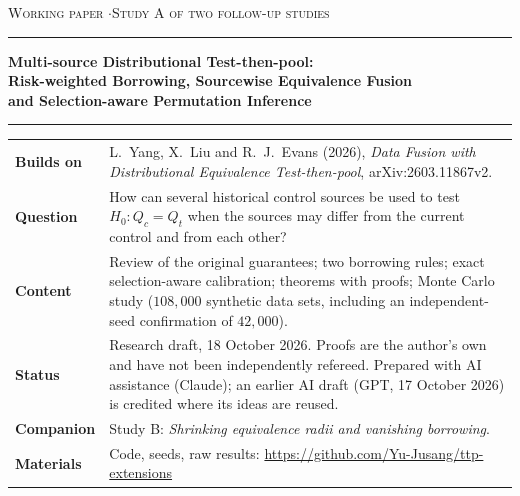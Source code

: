 \documentclass[11pt,a4paper]{article}
\begin{document}
\begin{titlepage}
\vspace*{20mm}
{\small\textsc{Working paper \quad$\cdot$\quad Study A of two follow-up studies}}\par
\vspace{6mm}
\rule{\textwidth}{0.6pt}\par\vspace{5mm}
{\LARGE\bfseries Multi-source Distributional Test-then-pool:\\[2mm] Risk-weighted Borrowing, Sourcewise Equivalence Fusion\\[2mm] and Selection-aware Permutation Inference\par}
\vspace{5mm}\rule{\textwidth}{0.6pt}\par
\vspace{10mm}
\begin{tabularx}{\textwidth}{@{}lX@{}}
\textbf{Builds on} & L.~Yang, X.~Liu and R.~J.~Evans (2026), \emph{Data Fusion with Distributional Equivalence Test-then-pool}, arXiv:2603.11867v2. \\[1mm]
\textbf{Question} & How can several historical control sources be used to test $H_0:Q_c=Q_t$ when the sources may differ from the current control and from each other? \\[1mm]
\textbf{Content} & Review of the original guarantees; two borrowing rules; exact selection-aware calibration; theorems with proofs; Monte Carlo study ($108{,}000$ synthetic data sets, including an independent-seed confirmation of $42{,}000$). \\[1mm]
\textbf{Status} & Research draft, 18 October 2026. Proofs are the author's own and have not been independently refereed. Prepared with AI assistance (Claude); an earlier AI draft (GPT, 17 October 2026) is credited where its ideas are reused. \\[1mm]
\textbf{Companion} & Study B: \emph{Shrinking equivalence radii and vanishing borrowing}. \\[1mm]
\textbf{Materials} & Code, seeds, raw results: \url{https://github.com/Yu-Jusang/ttp-extensions}
\end{tabularx}
\vfill
\end{titlepage}
\end{document}
